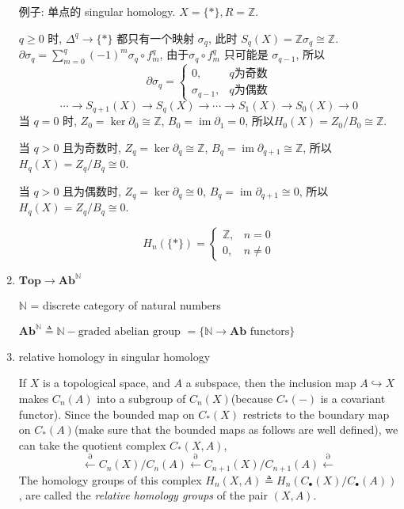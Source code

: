 \documentclass{ctexart}
\DeclareMathOperator{\im}{im}
\DeclareMathOperator{\homology}{H_\ast}
\newcommand{\Top}{\mathbf{Top}}
\newcommand{\Ab}{\mathbf{Ab}}
\begin{document}
\begin{enumerate}
例子: 单点的 singular homology. $X = \{\ast\}, R=\mathbb{Z}$.

$q\geq0$ 时, $\Delta^q \to \{\ast\}$ 都只有一个映射 $\sigma_q$, 此时 $S_q(X) = \mathbb{Z}\sigma_q \cong \mathbb{Z}$.
$\partial\sigma_q = \sum\limits_{m=0}^{q}(-1)^m\sigma_q\circ f_m^q$, 由于$\sigma_q\circ f_m^q$ 只可能是 $\sigma_{q-1}$, 所以
\[
\partial\sigma_q =
\begin{cases}
0, & q\text{为奇数}\\
\sigma_{q-1}, & q\text{为偶数}
\end{cases}
\]
\[
\cdots\to S_{q+1}(X)\to S_q(X) \to\cdots \to S_1(X)\to S_0(X)\to 0
\]
当 $q=0$ 时, $Z_0 = \ker\partial_0 \cong \mathbb{Z}$, $B_0 = \im\partial_1 = 0$, 所以$H_0(X) = Z_0/B_0 \cong \mathbb{Z}$.

当 $q > 0$ 且为奇数时, $Z_q = \ker\partial_q \cong \mathbb{Z}$, $B_q = \im\partial_{q+1} \cong \mathbb{Z}$, 所以 $H_q(X) = Z_q/B_q \cong 0$.

当 $q > 0$ 且为偶数时, $Z_q = \ker\partial_q \cong 0$, $B_q = \im\partial_{q+1} \cong 0$, 所以 $H_q(X) = Z_q/B_q \cong 0$.

\[
H_n(\{\ast\}) =
\begin{cases}
\mathbb{Z}, & n = 0\\
0, & n \neq 0
\end{cases}
\]

\item $\Top \overset{\homology}{\longrightarrow} \Ab^{\mathbb{N}}$

$\mathbb{N}$ = discrete category of natural numbers

$\Ab^{\mathbb{N}} \triangleq \mathbb{N}\!\!-\!\!\text{graded abelian group } = \{\mathbb{N} \to \Ab \text{ functors}\}$

\item relative homology in singular homology

If $X$ is a topological space, and $A$ a subspace, then the inclusion map $A\hookrightarrow X$ makes $C_n(A)$ into a subgroup of $C_n(X)$(because $C_{\ast}(-)$ is a covariant functor). Since the bounded map on $C_{\ast}(X)$ restricts to the boundary map on $C_{\ast}(A)$(make sure that the bounded maps as follows are well defined), we can take the quotient complex $C_{\ast}(X,A)$,
\[
\overset{\partial}{\leftarrow} C_n(X)/C_n(A) \overset{\partial}{\leftarrow} C_{n+1}(X)/C_{n+1}(A) \overset{\partial}{\leftarrow}
\]
The homology groups of this complex $H_n⁢(X,A) \triangleq H_n(C_{\bullet}(X)/C_{\bullet}(A))$, are called the \textit{relative homology groups} of the pair $(X,A)$.


\end{enumerate}
\end{document}
